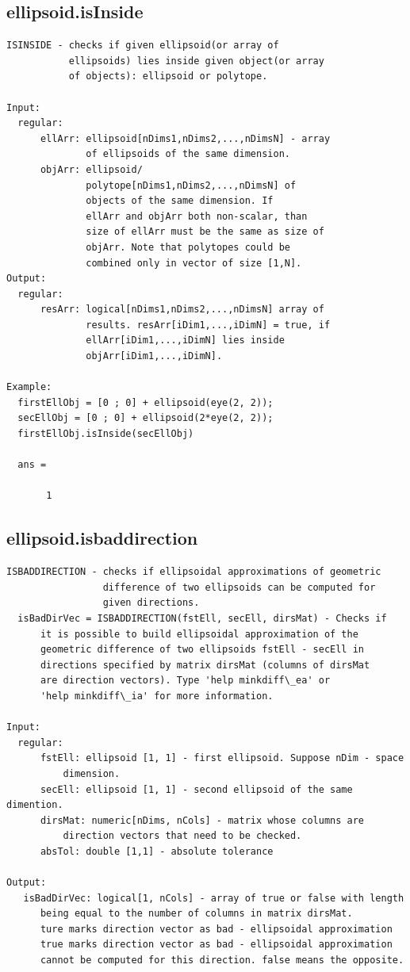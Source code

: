 \documentclass[letterpaper,10pt,english]{sphinxmanual}
\begin{document}
\subsection{ellipsoid.isInside}
\label{chap_functions:ellipsoid-isinside}
\begin{Verbatim}[commandchars=\\\{\}]
ISINSIDE - checks if given ellipsoid(or array of
           ellipsoids) lies inside given object(or array
           of objects): ellipsoid or polytope.

Input:
  regular:
      ellArr: ellipsoid[nDims1,nDims2,...,nDimsN] - array
              of ellipsoids of the same dimension.
      objArr: ellipsoid/
              polytope[nDims1,nDims2,...,nDimsN] of
              objects of the same dimension. If
              ellArr and objArr both non-scalar, than
              size of ellArr must be the same as size of
              objArr. Note that polytopes could be
              combined only in vector of size [1,N].
Output:
  regular:
      resArr: logical[nDims1,nDims2,...,nDimsN] array of
              results. resArr[iDim1,...,iDimN] = true, if
              ellArr[iDim1,...,iDimN] lies inside
              objArr[iDim1,...,iDimN].

Example:
  firstEllObj = [0 ; 0] + ellipsoid(eye(2, 2));
  secEllObj = [0 ; 0] + ellipsoid(2*eye(2, 2));
  firstEllObj.isInside(secEllObj)

  ans =

       1
\end{Verbatim}


\subsection{ellipsoid.isbaddirection}
\label{chap_functions:ellipsoid-isbaddirection}
\begin{Verbatim}[commandchars=\\\{\}]
ISBADDIRECTION - checks if ellipsoidal approximations of geometric
                 difference of two ellipsoids can be computed for
                 given directions.
  isBadDirVec = ISBADDIRECTION(fstEll, secEll, dirsMat) - Checks if
      it is possible to build ellipsoidal approximation of the
      geometric difference of two ellipsoids fstEll - secEll in
      directions specified by matrix dirsMat (columns of dirsMat
      are direction vectors). Type 'help minkdiff\_ea' or
      'help minkdiff\_ia' for more information.

Input:
  regular:
      fstEll: ellipsoid [1, 1] - first ellipsoid. Suppose nDim - space
          dimension.
      secEll: ellipsoid [1, 1] - second ellipsoid of the same dimention.
      dirsMat: numeric[nDims, nCols] - matrix whose columns are
          direction vectors that need to be checked.
      absTol: double [1,1] - absolute tolerance

Output:
   isBadDirVec: logical[1, nCols] - array of true or false with length
      being equal to the number of columns in matrix dirsMat.
      ture marks direction vector as bad - ellipsoidal approximation
      true marks direction vector as bad - ellipsoidal approximation
      cannot be computed for this direction. false means the opposite.
\end{Verbatim}
\end{document}
